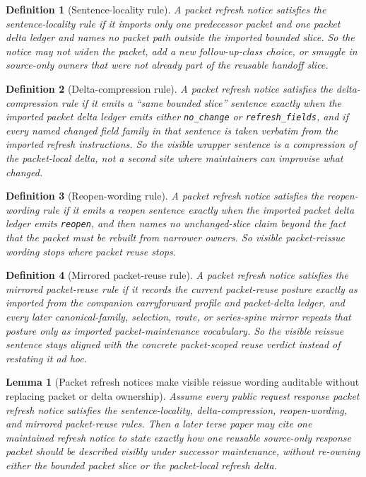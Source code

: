 \documentclass[11pt]{article}
\newtheorem{definition}{Definition}
\newtheorem{lemma}{Lemma}
\begin{document}
\begin{definition}[Sentence-locality rule]
A packet refresh notice satisfies the \emph{sentence-locality rule} if it imports only one predecessor packet and one packet delta ledger and names no packet path outside the imported bounded slice.
So the notice may not widen the packet, add a new follow-up-class choice, or smuggle in source-only owners that were not already part of the reusable handoff slice.
\end{definition}

\begin{definition}[Delta-compression rule]
A packet refresh notice satisfies the \emph{delta-compression rule} if it emits a ``same bounded slice'' sentence exactly when the imported packet delta ledger emits either \texttt{no\_change} or \texttt{refresh\_fields}, and if every named changed field family in that sentence is taken verbatim from the imported refresh instructions.
So the visible wrapper sentence is a compression of the packet-local delta, not a second site where maintainers can improvise what changed.
\end{definition}

\begin{definition}[Reopen-wording rule]
A packet refresh notice satisfies the \emph{reopen-wording rule} if it emits a reopen sentence exactly when the imported packet delta ledger emits \texttt{reopen}, and then names no unchanged-slice claim beyond the fact that the packet must be rebuilt from narrower owners.
So visible packet-reissue wording stops where packet reuse stops.
\end{definition}

\begin{definition}[Mirrored packet-reuse rule]
A packet refresh notice satisfies the \emph{mirrored packet-reuse rule} if it records the current packet-reuse posture exactly as imported from the companion carryforward profile and packet-delta ledger, and every later canonical-family, selection, route, or series-spine mirror repeats that posture only as imported packet-maintenance vocabulary.
So the visible reissue sentence stays aligned with the concrete packet-scoped reuse verdict instead of restating it ad hoc.
\end{definition}

\begin{lemma}[Packet refresh notices make visible reissue wording auditable without replacing packet or delta ownership]
Assume every public request response packet refresh notice satisfies the sentence-locality, delta-compression, reopen-wording, and mirrored packet-reuse rules.
Then a later terse paper may cite one maintained refresh notice to state exactly how one reusable source-only response packet should be described visibly under successor maintenance, without re-owning either the bounded packet slice or the packet-local refresh delta.
\end{lemma}
\end{document}

